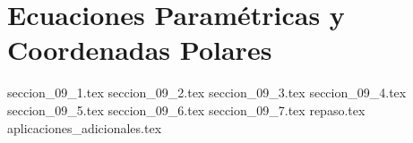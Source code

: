 
\chapter{Ecuaciones Paramétricas y Coordenadas Polares}

{seccion_09_1.tex}
{seccion_09_2.tex}
{seccion_09_3.tex}
{seccion_09_4.tex}
{seccion_09_5.tex}
{seccion_09_6.tex}
{seccion_09_7.tex}
{repaso.tex}
{aplicaciones_adicionales.tex}

